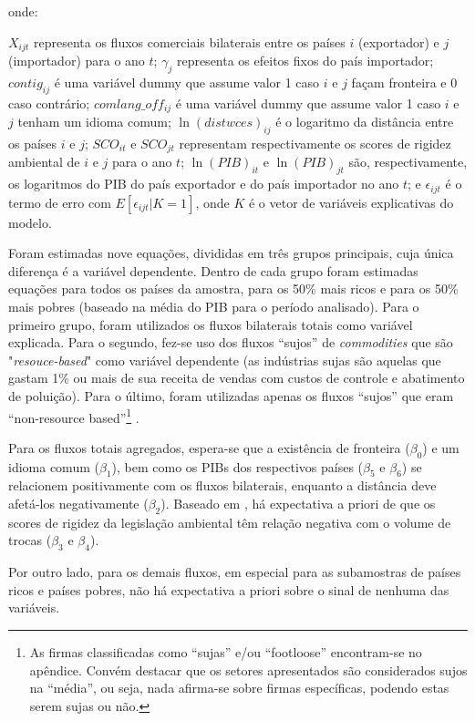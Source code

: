 onde:

$X_{ijt}$ representa os fluxos comerciais bilaterais entre os países $i$ (exportador) e $j$ (importador) para o ano $t$;  $\gamma_j$ representa os efeitos fixos do país importador; $contig_{ij}$ é uma variável dummy que assume valor 1 caso $i$ e $j$ façam fronteira e 0 caso contrário; $comlang\_off_{ij}$ é uma variável dummy que assume valor 1 caso $i$ e $j$ tenham um idioma comum; $\ln(distwces)_{ij}$ é o logaritmo da distância entre os países $i$ e $j$; $SCO_{it}$ e $SCO_{jt}$ representam respectivamente os scores de rigidez ambiental de $i$ e $j$ para o ano $t$; $\ln(PIB)_{it}$ e $\ln(PIB)_{jt}$ são, respectivamente, os logaritmos do PIB do país exportador e do país importador no ano $t$; e $\epsilon_{ijt}$ é o termo de erro com $E[\epsilon_{ijt} |K=1]$, onde $K$ é o vetor de variáveis explicativas do modelo.

Foram estimadas nove equações, divididas em três grupos principais, cuja única diferença é a variável dependente. Dentro de cada grupo foram estimadas equações para todos os países da amostra, para os 50\% mais ricos e para os 50\% mais pobres (baseado na média do PIB para o período analisado). Para o primeiro grupo, foram utilizados os fluxos bilaterais totais como variável explicada. Para o segundo, fez-se uso dos fluxos “sujos” de \textit{commodities} que são "\textit{resouce-based}" como variável dependente (as indústrias sujas são aquelas que gastam 1\% ou mais de sua receita de vendas com custos de controle e abatimento de poluição). Para o último, foram utilizadas apenas os fluxos “sujos” que eram “non-resource based”\footnote{As firmas classificadas como “sujas” e/ou “footloose” encontram-se no apêndice. Convém destacar que os setores apresentados são considerados sujos na “média”, ou seja, nada afirma-se sobre firmas específicas, podendo estas serem sujas ou não.} . 

Para os fluxos totais agregados, espera-se que a existência de fronteira ($\beta_0$) e um idioma comum ($\beta_1$), bem como os PIBs dos respectivos países ($\beta_5$ e $\beta_6$) se relacionem positivamente com os fluxos bilaterais, enquanto a distância deve afetá-los negativamente ($\beta_2$). Baseado em , há expectativa a priori de que os scores de rigidez da legislação ambiental têm relação negativa com o volume de trocas ($\beta_3$ e $\beta_4$).

Por outro lado, para os demais fluxos, em especial para as subamostras de países ricos e países pobres, não há expectativa a priori sobre o sinal de nenhuma das variáveis.

